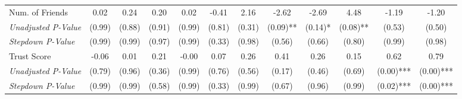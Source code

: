 \begin{tabular}{l c c c c c c c c c c c}
Num. of Friends & 0.02 & 0.24 & 0.20 & 0.02 & -0.41 & 2.16 & -2.62 & -2.69 & 4.48 & -1.19 & -1.20 \\
\quad \textit{Unadjusted P-Value} & (0.99) & (0.88) & (0.91) & (0.99) & (0.81) & (0.31) & (0.09)** & (0.14)* & (0.08)** & (0.53) & (0.50) \\
\quad \textit{Stepdown P-Value} & (0.99) & (0.99) & (0.97) & (0.99) & (0.33) & (0.98) & (0.56) & (0.66) & (0.80) & (0.99) & (0.98) \\
Trust Score & -0.06 & 0.01 & 0.21 & -0.00 & 0.07 & 0.26 & 0.41 & 0.26 & 0.15 & 0.62 & 0.79 \\
\quad \textit{Unadjusted P-Value} & (0.79) & (0.96) & (0.36) & (0.99) & (0.76) & (0.56) & (0.17) & (0.46) & (0.69) & (0.00)*** & (0.00)*** \\
\quad \textit{Stepdown P-Value} & (0.99) & (0.99) & (0.58) & (0.99) & (0.33) & (0.99) & (0.67) & (0.96) & (0.99) & (0.02)*** & (0.00)*** \\
\bottomrule
\end{tabular}
